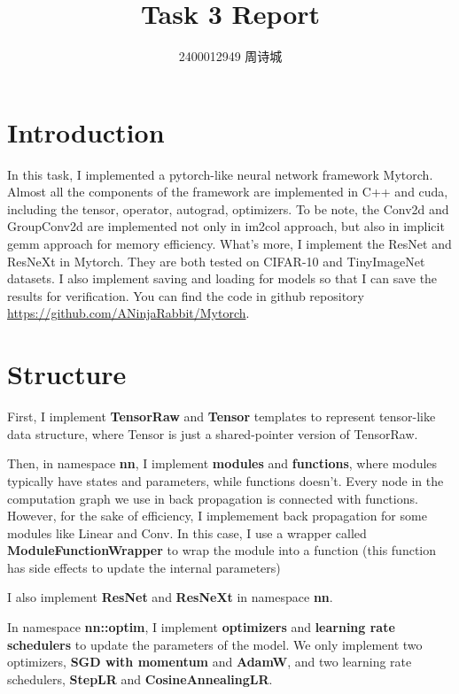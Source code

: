 \documentclass{ctexart}
\title{Task 3 Report}
\author{2400012949 周诗城}
\date{}
\begin{document}
\maketitle
\section{Introduction}
In this task, I implemented a pytorch-like neural network framework Mytorch.
Almost all the components of the framework are implemented in C++ and cuda, including the tensor,
operator, autograd, optimizers. To be note, the Conv2d and GroupConv2d are implemented not only in im2col approach, 
but also in implicit gemm approach for memory efficiency. What's more, I implement the ResNet and ResNeXt in Mytorch.
They are both tested on CIFAR-10 and TinyImageNet datasets. I also implement saving and loading for models so that I can save 
the results for verification. You can find the code in github repository \url{https://github.com/ANinjaRabbit/Mytorch}.
\section{Structure}
First, I implement \textbf{TensorRaw} and \textbf{Tensor} templates to represent tensor-like data structure, where Tensor is just a 
shared-pointer version of TensorRaw.

Then, in namespace \textbf{nn}, I implement \textbf{modules} and \textbf{functions}, where modules typically have states and parameters, while functions doesn't. Every node 
in the computation graph we use in back propagation is connected with functions. However, for the sake of efficiency, I implemement back propagation for 
some modules like Linear and Conv. In this case, I use a wrapper called \textbf{ModuleFunctionWrapper} to wrap the module into a function (this function has 
side effects to update the internal parameters)

I also implement \textbf{ResNet} and \textbf{ResNeXt} in namespace \textbf{nn}.

In namespace \textbf{nn::optim}, I implement \textbf{optimizers} and \textbf{learning rate schedulers} to update the parameters of the model. We only implement two optimizers, 
\textbf{SGD with momentum} and \textbf{AdamW}, and two learning rate schedulers, \textbf{StepLR} and \textbf{CosineAnnealingLR}.
\end{document}
